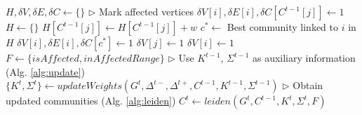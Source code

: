 \begin{algorithm}[hbtp]
\begin{algorithmic}[1]
  \State $H, \delta V, \delta E, \delta C \gets \{\}$ \label{alg:delta--init}
  \State $\rhd$ Mark affected vertices
   \label{alg:delta--loopdel-begin}
      \State $\delta V[i], \delta E[i], \delta C[C^{t-1}[j]] \gets 1$ \label{alg:delta--loopdelmark}
    \EndIf
  \EndFor \label{alg:delta--loopdel-end}
   \label{alg:delta--loopins-begin}
    \State $H \gets \{\}$
     \label{alg:delta--loopinssrc-begin}
        \State $H[C^{t-1}[j]] \gets H[C^{t-1}[j]] + w$
      \EndIf
    \EndFor \label{alg:delta--loopinssrc-end}
    \State $c^* \gets$ Best community linked to $i$ in $H$ \label{alg:delta--loopinschoose}
    \State $\delta V[i], \delta E[i], \delta C[c^*] \gets 1$ \label{alg:delta--loopinsmark}
  \EndFor \label{alg:delta--loopins-end}
   \label{alg:delta--loopaff-begin}
     \label{alg:delta--loopaffnei-begin}
        \State $\delta V[j] \gets 1$
      \EndFor
    \EndIf \label{alg:delta--loopaffnei-end}
     \label{alg:delta--loopaffcom-begin}
      \State $\delta V[i] \gets 1$
    \EndIf \label{alg:delta--loopaffcom-end}
  \EndFor \label{alg:delta--loopaff-end}
   \label{alg:delta--isaff-begin}
  \EndFunction \label{alg:delta--isaff-end}
   \label{alg:delta--isaffrng-begin}
  \EndFunction \label{alg:delta--isaffrng-end}
  \State $F \gets \{isAffected, inAffectedRange\}$ \label{alg:delta--lambdas}
  \State $\rhd$ Use $K^{t-1}$, $\Sigma^{t-1}$ as auxiliary information (Alg. \ref{alg:update})
  \State $\{K^t, \Sigma^t\} \gets updateWeights(G^t, \Delta^{t-}, \Delta^{t+}, C^{t-1}, K^{t-1}, \Sigma^{t-1})$\label{alg:delta--auxiliary}
  \State $\rhd$ Obtain updated communities (Alg. \ref{alg:leiden})
  \State $C^t \gets leiden(G^t, C^{t-1}, K^t, \Sigma^t, F)$ \label{alg:delta--leiden}
   \label{alg:delta--return}
\EndFunction
\end{algorithmic}
\end{algorithm}
